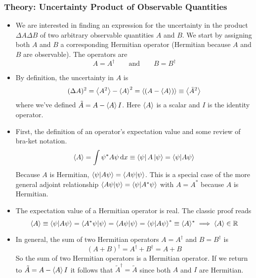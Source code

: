 \documentclass[11pt, a4paper]{article}
\newcommand{\diff}{\mathop{}\!\mathrm{d}} %
\newcommand{\eqtext}[1]{\qquad \text{#1} \qquad}
\begin{document}
\subsubsection{Theory: Uncertainty Product of Observable Quantities}
\begin{itemize}
	\item We are interested in finding an expression for the uncertainty in the product $ \Delta A \Delta B $ of two arbitrary observable quantities $ A $ and $ B $. We start by assigning both $ A $ and $ B $ a corresponding Hermitian operator (Hermitian because $ A $ and $ B $ are observable). The operators are
	\begin{equation*}
		A = A^{\dagger} \eqtext{and} B = B^{\dagger}
	\end{equation*}
	
	\item By definition, the uncertainty in $ A $ is
	\begin{equation*}
		(\Delta A)^{2} = \expval{A^{2}} - \expval{A}^{2} = \expval{(A - \expval{A})} \equiv \big\langle \tilde{A}^{2} \big\rangle
	\end{equation*}
	where we've defined $ \tilde{A} = A - \expval{A}I $. Here $ \expval{A} $ is a scalar and $ I $ is the identity operator. 
	
	\item First, the definition of an operator's expectation value and some review of bra-ket notation.
	\begin{equation*}
		\ev{A} = \int \psi^{*} A \psi \diff x \equiv \bra{\psi}A\ket{\psi} = \braket{\psi}{A\psi}
	\end{equation*}
	Because $ A $ is Hermitian, $ \braket{\psi}{A\psi} = \braket{A\psi}{\psi} $. This is a special case of the more general adjoint relationship $ \braket{A\psi}{\psi} = \braket{\psi}{A^{*}\psi} $ with $ A = A^{*} $ because $ A $ is Hermitian. 
	
	\item The expectation value of a Hermitian operator is real. The classic proof reads
	\begin{equation*}
		\ev{A} \equiv \braket{\psi}{A\psi} = \braket{A^{*}\psi}{\psi} = \braket{A\psi}{\psi} = \braket{\psi}{A\psi}^{*} \equiv \langle A \rangle^{*} \implies \langle A \rangle \in \mathbb{R}
	\end{equation*}
	
	\item In general, the sum of two Hermitian operators $ A = A^{\dagger} $ and $ B = B^{\dagger} $ is
	\begin{equation*}
		(A + B)^{\dagger} = A^{\dagger} + B^{\dagger} = A + B
	\end{equation*}
	So the sum of two Hermitian operators is a Hermitian operator. If we return to $ \tilde{A} = A - \expval{A}I  $ it follows that $ \tilde{A}^{\dagger} = \tilde{A} $ since both $ A $ and $ I $ are Hermitian.
	

\end{itemize}
\end{document}
